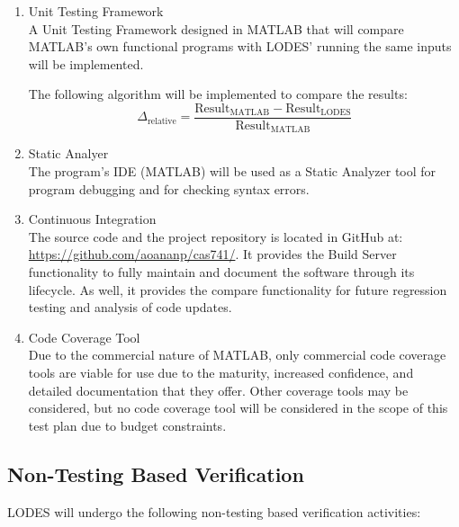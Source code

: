 \documentclass[12pt, titlepage]{article}
\newcommand{\famname}{LODES} %
\newcommand{\famurl}{https://github.com/aoananp/cas741/}
\begin{document}
\begin{enumerate}
\item{Unit Testing Framework\\}
A Unit Testing Framework designed in MATLAB that will compare MATLAB's own functional programs
with
\famname{}' running the same inputs will be implemented.

The following algorithm will be implemented to compare the results:
$$\Delta_{\text{relative}} = \frac{\text{Result}_\text{MATLAB} - \text{Result}_\text{\famname{}}} {\text{Result}_\text{MATLAB}} $$

\item{Static Analyer\\}
The program's IDE (MATLAB) will be used as a Static Analyzer tool for program debugging and
for checking syntax errors.

\item{Continuous Integration\\}
The source code and the project repository is located in GitHub at: \url{\famurl}.
It provides the Build Server functionality to fully maintain and document the software through its lifecycle.
As well, it provides the compare functionality for future regression testing and analysis of code updates.

\item{Code Coverage Tool\\}
Due to the commercial nature of MATLAB, only commercial code coverage tools are viable for use due to the maturity, increased confidence, and detailed documentation that they offer. Other coverage tools may be considered, but no code coverage tool will be considered in the scope of this test plan due to budget constraints.

\end{enumerate}


		

\subsection{Non-Testing Based Verification}
\famname{} will undergo the following non-testing based verification activities:
\end{document}
